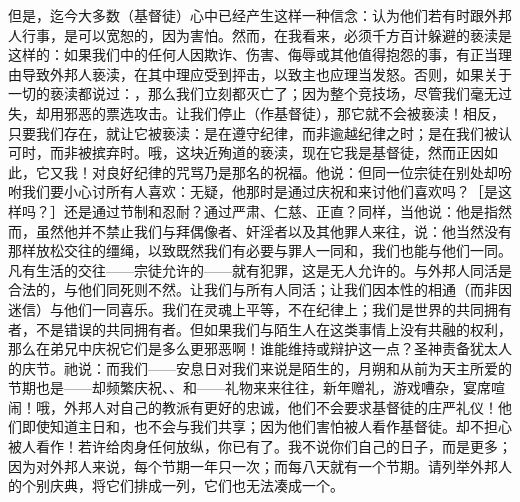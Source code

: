 但是，迄今大多数（基督徒）心中已经产生这样一种信念：认为他们若有时跟外邦人行事，是可以宽恕的，因为害怕。然而，在我看来，必须千方百计躲避的亵渎是这样的：如果我们中的任何人因欺诈、伤害、侮辱或其他值得抱怨的事，有正当理由导致外邦人亵渎，在其中理应受到抨击，以致主也应理当发怒。否则，如果关于一切的亵渎都说过：，那么我们立刻都灭亡了；因为整个竞技场，尽管我们毫无过失，却用邪恶的票选攻击。让我们停止（作基督徒），那它就不会被亵渎！相反，只要我们存在，就让它被亵渎：是在遵守纪律，而非逾越纪律之时；是在我们被认可时，而非被摈弃时。哦，这块近殉道的亵渎，现在它我是基督徒，然而正因如此，它又我！对良好纪律的咒骂乃是那名的祝福。他说：但同一位宗徒在别处却吩咐我们要小心讨所有人喜欢：无疑，他那时是通过庆祝和来讨他们喜欢吗？［是这样吗？］还是通过节制和忍耐？通过严肃、仁慈、正直？同样，当他说：他是指然而，虽然他并不禁止我们与拜偶像者、奸淫者以及其他罪人来往，说：他当然没有那样放松交往的缰绳，以致既然我们有必要与罪人一同和，我们也能与他们一同。凡有生活的交往——宗徒允许的——就有犯罪，这是无人允许的。与外邦人同活是合法的，与他们同死则不然。让我们与所有人同活；让我们因本性的相通（而非因迷信）与他们一同喜乐。我们在灵魂上平等，不在纪律上；我们是世界的共同拥有者，不是错误的共同拥有者。但如果我们与陌生人在这类事情上没有共融的权利，那么在弟兄中庆祝它们是多么更邪恶啊！谁能维持或辩护这一点？圣神责备犹太人的庆节。祂说：而我们——安息日对我们来说是陌生的，月朔和从前为天主所爱的节期也是——却频繁庆祝、、和——礼物来来往往，新年赠礼，游戏嘈杂，宴席喧闹！哦，外邦人对自己的教派有更好的忠诚，他们不会要求基督徒的庄严礼仪！他们即使知道主日和，也不会与我们共享；因为他们害怕被人看作基督徒。却不担心被人看作！若许给肉身任何放纵，你已有了。我不说你们自己的日子，而是更多；因为对外邦人来说，每个节期一年只一次；而每八天就有一个节期。请列举外邦人的个别庆典，将它们排成一列，它们也无法凑成一个。\par

